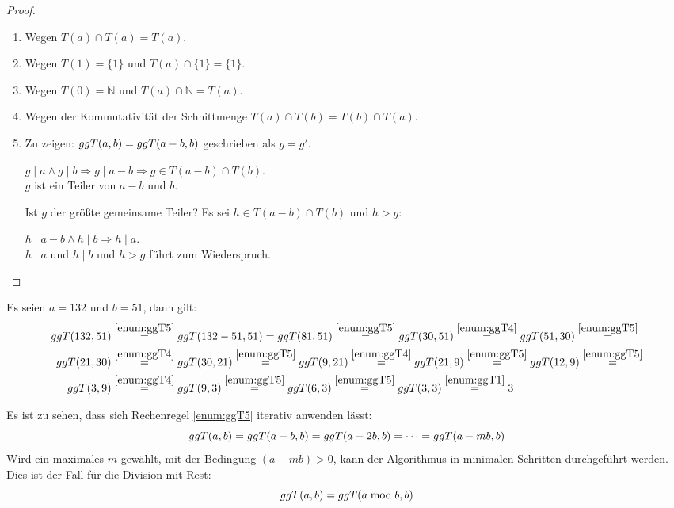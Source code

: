 \begin{proof}\mbox{}
  \begin{enumerate}
    \item Wegen $T(a) \cap T(a) = T(a)$.
    \item Wegen $T(1) = \{1\}$ und $T(a) \cap \{1\} = \{1\}$.
    \item Wegen $T(0) = \mathbb{N}$ und $T(a) \cap \mathbb{N} = T(a)$.
    \item Wegen der Kommutativität der Schnittmenge $T(a) \cap T(b) = T(b)\cap T(a)$.
    \item Zu zeigen: $ggT(a,b) = ggT(a - b,b)$ geschrieben als $g = g'$.
          \begin{center}
            $g \mid a \wedge g \mid b \Rightarrow g \mid a-b \Rightarrow g \in T(a-b) \cap T(b)$.\\
            $g$ ist ein Teiler von $a-b$ und $b$.
          \end{center}
          Ist $g$ der größte gemeinsame Teiler?
          Es sei $h \in T(a-b) \cap T(b)$ und $h > g$:
          \begin{center}
            $h \mid a-b \wedge h \mid b \Rightarrow h \mid a$.\\
            $h \mid a$ und $h \mid b$ und $h > g$ führt zum Wiederspruch.
          \end{center}
  \end{enumerate}
\end{proof}

\begin{example}
  Es seien $a=132$ und $b=51$, dann gilt:
  \begin{align*}
    ggT(132,51) & \stackrel{\ref{enum:ggT5}}{=} ggT(132 - 51,51) =
    ggT(81,51) \stackrel{\ref{enum:ggT5}}{=} ggT(30,51) \stackrel{\ref{enum:ggT4}}{=}
    ggT(51,30) \stackrel{\ref{enum:ggT5}}{=}                                          \\
    ggT(21,30)  & \stackrel{\ref{enum:ggT4}}{=}  ggT(30,21) \stackrel{\ref{enum:ggT5}}{=}
    ggT(9,21) \stackrel{\ref{enum:ggT4}}{=}
    ggT(21,9) \stackrel{\ref{enum:ggT5}}{=} ggT(12,9) \stackrel{\ref{enum:ggT5}}{=}       \\
    ggT(3,9)    & \stackrel{\ref{enum:ggT4}}{=} ggT(9,3) \stackrel{\ref{enum:ggT5}}{=}
    ggT(6,3) \stackrel{\ref{enum:ggT5}}{=} ggT(3,3) \stackrel{\ref{enum:ggT1}}{=} 3 \qedhere
  \end{align*}
\end{example}

\noindent
Es ist zu sehen, dass sich Rechenregel \ref{enum:ggT5} iterativ anwenden lässt:
\begin{equation*}
  ggT(a,b) = ggT(a-b,b) = ggT(a-2b,b) = \dots = ggT(a-mb,b)
\end{equation*}
Wird ein maximales $m$ gewählt, mit der Bedingung $(a-mb) > 0$, kann der Algorithmus
in minimalen Schritten durchgeführt werden. Dies ist der Fall für die Division mit Rest:
\begin{equation*}
  ggT(a,b) = ggT(a \bmod{b},b)
\end{equation*}

